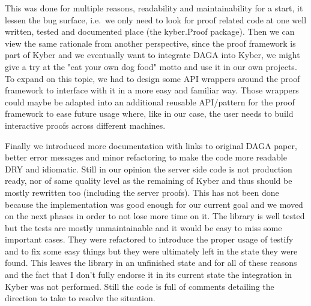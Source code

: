     This was done for multiple reasons, readability and maintainability for a start, it lessen the bug surface, i.e.\ we only need
    to look for proof related code at one well written, tested and documented place (the kyber.Proof package).
    Then we can view the same rationale from another perspective, since the proof framework is part of Kyber and we eventually
    want to integrate DAGA into Kyber, we might give a try at the "eat your own dog food" motto and use it in our own projects.
    To expand on this topic, we had to design some API wrappers around the proof framework to interface with it in a more
    easy and familiar way.
    Those wrappers could maybe be adapted into an additional reusable API/pattern for the proof framework to ease future
    usage where, like in our case, the user needs to build interactive proofs across different machines.

    Finally we introduced more documentation with links to original DAGA paper, better error messages and minor refactoring to
    make the code more readable DRY and idiomatic.\newline
    Still in our opinion the server side code is not production ready, nor of same quality level as the remaining of Kyber
    and thus should be mostly rewritten too (including the server proofs).
    This has not been done because the implementation was good enough for our current goal and we moved
    on the next phases in order to not lose more time on it.
    The library is well tested but the tests are mostly unmaintainable and it would be easy to miss some important cases.
    They were refactored to introduce the proper usage of testify and to fix some easy things but they were ultimately left in
    the state they were found.
    This leaves the library in an unfinished state and for all of these reasons and the fact that I don't fully endorse it
    in its current state the integration in Kyber was not performed.
    Still the code is full of comments detailing the direction to take to resolve the situation.




